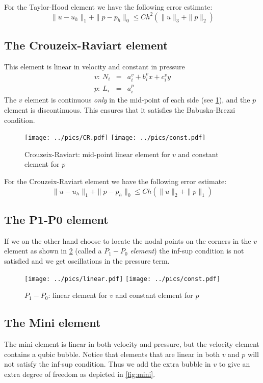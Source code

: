 \documentclass[a4paper,11pt]{amsart}
\begin{document}
For the Taylor-Hood element we have the following error estimate:
\[\|u-u_h\|_1 + \|p-p_h\|_0 \leq Ch^2 (\|u\|_{3} + \|p\|_{2})\]

\subsection{The Crouzeix-Raviart element}
This element is linear in velocity and constant in pressure
\begin{eqnarray*}
v:\ N_i &=& a_i^v + b_i^vx + c_i^vy\\
p:\ L_i &=& a_i^p
\end{eqnarray*}
The $v$ element is continuous \emph{only} in the mid-point of each side (see \ref{fig:CR_CR}), and the $p$ element is discontinuous. This ensures that it satisfies the Babuska-Brezzi condition.

\begin{figure}[h]
\begin{center}
\label{fig:CR_CR}
\texttt{[image: ../pics/CR.pdf]}
\texttt{[image: ../pics/const.pdf]}
\caption{Crouzeix-Raviart: mid-point linear element for $v$ and constant element for $p$}
\end{center}
\end{figure}

For the Crouzeix-Raviart element we have the following error estimate:
\[\|u-u_h\|_1 + \|p-p_h\|_0 \leq Ch (\|u\|_{2} + \|p\|_{1})\]


\subsection{The P1-P0 element}

If we on the other hand choose to locate the nodal points on the corners in the $v$ element as shown in \ref{fig:PP_lin} (called a $\mathit{P_1-P_0}$ \emph{element}) the inf-sup condition is not satisfied and we get oscillations in the pressure term.

\begin{figure}[h]
\begin{center}
\label{fig:PP_lin}
\texttt{[image: ../pics/linear.pdf]}
\texttt{[image: ../pics/const.pdf]}
\caption{$P_1-P_0$: linear element for $v$ and constant element for $p$}
\end{center}
\end{figure}

\subsection{The Mini element}
The mini element is linear in both velocity and pressure, but the velocity element contains a qubic bubble. Notice that elements that are linear in both $v$ and $p$ will not satisfy the inf-sup condition.  Thus we add the extra bubble in $v$ to give an extra degree of freedom as depicted in \ref{fig:mini}.
\end{document}
